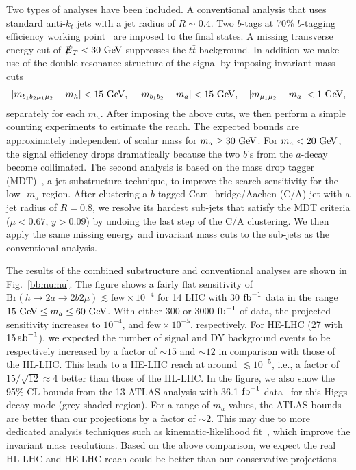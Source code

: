 Two types of analyses have been included. A conventional analysis that uses standard anti-$k_t$ jets with a jet radius of $R\sim 0.4$. Two $b$-tags at 70\% $b$-tagging efficiency working point~\cite{ATLAS:2014cal}  are imposed to the final states. A missing transverse energy cut of $\slashed{E}_T < 30 ~\text{GeV}$ suppresses the $t \bar t$ background. In addition we make use of the double-resonance structure of the signal by imposing invariant mass cuts 
\begin{align}
|m_{b_1 b_2 \mu_1 \mu_2}-m_h|< 15~\text{GeV},\quad |m_{b_1 b_2}-m_a|< 15~\text{GeV},\quad|m_{\mu_1\mu_2}-m_a| < 1~\text{GeV},
\end{align}
separately for each $m_a$. After imposing the above cuts, we then perform a simple counting experiments to estimate the reach. The expected bounds are approximately independent of scalar mass for $m_a \geq 30 ~\text{GeV}$. For $m_a < 20 ~\text{GeV}$, the signal efficiency drops dramatically because the two $b$'s from the $a$-decay become collimated. The second analysis is based on the mass drop tagger (MDT)~\cite{Butterworth:2008sd}, a jet substructure technique, to improve the search sensitivity for the low -$m_a$ region. After clustering a $b$-tagged Cam- bridge/Aachen (C/A) jet with a jet radius of $R=0.8$, we resolve its hardest sub-jets that satisfy the MDT criteria ($\mu < 0.67$, $y>0.09$) by undoing the last step of the C/A clustering. We then apply the same missing energy and invariant mass cuts to the sub-jets as the conventional analysis.

The results of the combined substructure and conventional analyses are shown in Fig.~\ref{bbmumu}. The figure shows a fairly flat sensitivity of  $\mathrm{Br}(h \to 2a \to 2b2\mu) \lesssim \text{few}\times10^{-4}$ for 14 \UTeV LHC with 30 ${\rm fb}^{-1}$ data in the range $15~\text{GeV} \leq m_a \leq 60 ~\text{GeV}$. With either 300 or 3000 ${\rm fb}^{-1}$ of data, the projected sensitivity increases to  $10^{-4}$, and $\text{few}\times 10^{-5}$, respectively. For HE-LHC (27 \UTeV with $15\mbox{\ensuremath{\,\text{ab}^\text{$-$1}}}$), we expected the number of signal and DY background events to be respectively increased by a factor of $\sim15$ and $\sim12$ in comparison with those of the HL-LHC. This leads to a HE-LHC reach at around $\lesssim 10^{-5}$, i.e., a factor of $15/\sqrt{12}\approx 4$ better than those of the HL-LHC. In the figure, we also show the 95\% CL bounds from the 13 \UTeV ATLAS analysis with 36.1 ${\rm fb}^{-1}$ data~\cite{Aaboud:2018esj} for this Higgs decay mode (grey shaded region). For a range of $m_a$ values, the ATLAS bounds are better than our projections  by a factor of $\sim 2$. This may due to more dedicated analysis techniques such as kinematic-likelihood fit~\cite{Aaboud:2018esj}, which improve the invariant mass resolutions. Based on the above comparison, we expect the real HL-LHC and HE-LHC reach could be better than our conservative projections. 



